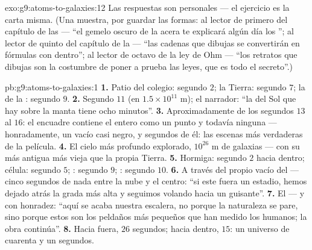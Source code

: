 \begin{solution}{exo:g9:atoms-to-galaxies:12}
Las respuestas son personales --- el ejercicio es la carta misma. (Una
muestra, por guardar las formas: al lector de primero del capítulo de
las  --- ``el gemelo oscuro de la acera te explicará algún
día los ''; al lector de quinto del capítulo de la
 --- ``las cadenas que dibujas se convertirán en fórmulas con
 dentro''; al lector de octavo de la ley de Ohm --- ``los
retratos que dibujas son la costumbre de poner a prueba las leyes, que
es todo el secreto''.)
\end{solution}

\begin{solution}{pb:g9:atoms-to-galaxies:1}
\textbf{1.} Patio del colegio: segundo $2$; la Tierra: segundo $7$; la
 de la : segundo $9$.
\textbf{2.} Segundo $11$ (en $1.5 \times 10^{11}$ \unit{m}); el
narrador: ``la  del Sol que hay sobre la manta tiene ocho minutos''.
\textbf{3.} Aproximadamente de los segundos $13$ al $16$: el encuadre
contiene el  entero como un punto y todavía ninguna
 --- honradamente, un vacío casi negro, y segundos de él:
las escenas más verdaderas de la película.
\textbf{4.} El cielo más profundo explorado, $10^{26}$ \unit{m} de
galaxias --- con su  más antigua más vieja que la propia
Tierra.
\textbf{5.} Hormiga: segundo $2$ hacia dentro; célula: segundo $5$;
: segundo $9$; : segundo $10$.
\textbf{6.} A través del propio vacío del  --- cinco segundos
de nada entre la nube y el centro: ``si este  fuera un
estadio, hemos dejado atrás la grada más alta y seguimos volando hacia
un guisante''.
\textbf{7.} El  --- y con honradez: ``aquí se acaba nuestra
escalera, no porque la naturaleza se pare, sino porque estos son los
peldaños más pequeños que han medido los humanos; la obra continúa''.
\textbf{8.} Hacia fuera, $26$ segundos; hacia dentro, $15$: un universo
de cuarenta y un segundos.

\end{solution}
